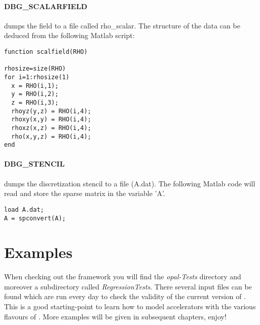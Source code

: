 \paragraph{DBG\_SCALARFIELD} dumps the field to a file called rho\_scalar. The structure of the data can be deduced from the following Matlab script:

\begin{verbatim}
function scalfield(RHO)

rhosize=size(RHO)
for i=1:rhosize(1)
  x = RHO(i,1);
  y = RHO(i,2);
  z = RHO(i,3);
  rhoyz(y,z) = RHO(i,4);
  rhoxy(x,y) = RHO(i,4);
  rhoxz(x,z) = RHO(i,4);
  rho(x,y,z) = RHO(i,4);
end
\end{verbatim}

\paragraph{DBG\_STENCIL} dumps the discretization stencil to a file (A.dat). The following Matlab code will read and store the sparse matrix in the variable 'A'.

\begin{verbatim}
load A.dat;
A = spconvert(A);
\end{verbatim}


\section{Examples}
When checking out the \opal framework you will find the {\em opal-Tests} directory and moreover
a subdirectory called {\em RegressionTests}. There several input files can be found which are
run every day to check the validity of the current version of \opal. This is a good starting-point to learn how to
model accelerators with the various flavours of \opal. More examples will be given in subsequent chapters, enjoy!



